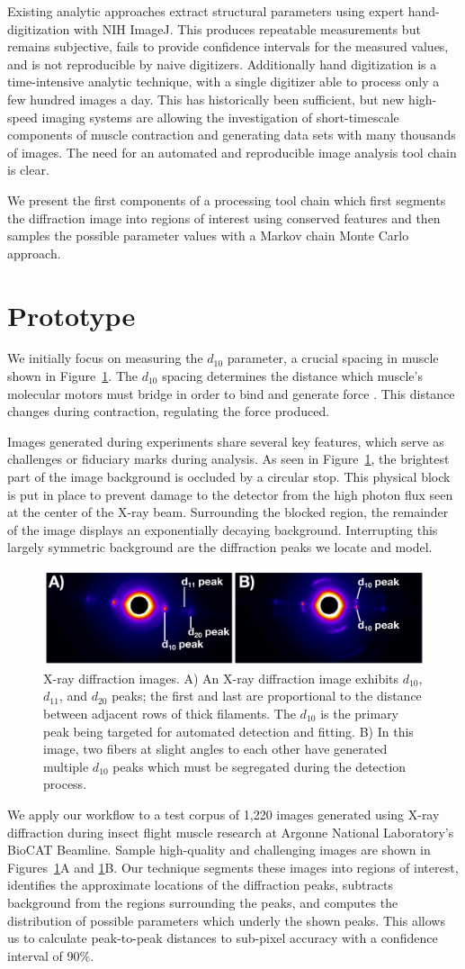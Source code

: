 \documentclass{sig-alternate}
\newcommand{\figureimgs}{
\begin{figure}[tbp]
  \centering
  \includegraphics[width=\linewidth]{figures/x_ray_image_montage}
  \vspace{-12pt}
  \caption{\label{fig:imgs}
  	X-ray diffraction images.
    A) An X-ray diffraction image exhibits $d_{10}$, $d_{11}$, and
    $d_{20}$ peaks; the first and last are proportional to the
    distance between adjacent rows of thick filaments. The $d_{10}$ is
    the primary peak being targeted for automated detection and
    fitting. B) In this image, two fibers at slight angles to each
    other have generated multiple $d_{10}$ peaks which must be
    segregated during the detection process.  
	}
	\vspace{-2pt}
\end{figure}
}
\begin{document}
Existing analytic approaches extract structural parameters using
expert hand-digitization with NIH ImageJ. This produces repeatable
measurements but remains subjective, fails to provide confidence
intervals for the measured values, and is not reproducible by naive
digitizers. Additionally hand digitization is a time-intensive
analytic technique, with a single digitizer able to process only a few
hundred images a day.  This has historically been sufficient, but new
high-speed imaging systems are allowing the investigation of
short-timescale components of muscle contraction and generating data
sets with many thousands of images. The need for an automated and
reproducible image analysis tool chain is clear. 

We present the first components of a processing tool chain which first
segments the diffraction image into regions of interest using
conserved features and then samples the possible parameter values with
a Markov chain Monte Carlo approach.  


\section{Prototype}
\label{sec:proto}


We initially focus on measuring the $d_{10}$ parameter, a crucial
spacing in muscle shown in Figure~\ref{fig:imgs}. The $d_{10}$ spacing
determines the distance which muscle's molecular motors must bridge in
order to bind and generate force \cite{Williams2013}. This distance
changes during contraction, regulating the force produced.

Images generated during experiments share several key features, which
serve as challenges or fiduciary marks during analysis. As seen in
Figure~\ref{fig:imgs}, the brightest part of the image background is
occluded by a circular stop. This physical block is put in place to
prevent damage to the detector from the high photon flux seen at the
center of the X-ray beam. Surrounding the blocked region, the
remainder of the image displays an exponentially decaying background.
Interrupting this largely symmetric background are the diffraction
peaks we locate and model. 

\figureimgs

We apply our workflow to a test corpus of 1,220 images generated using
X-ray diffraction during insect flight muscle research at Argonne
National Laboratory's BioCAT Beamline. Sample high-quality and
challenging images are shown in Figures~\ref{fig:imgs}A and
\ref{fig:imgs}B. Our technique segments these images into regions of
interest, identifies the approximate locations of the diffraction
peaks, subtracts background from the regions surrounding the peaks,
and computes the distribution of possible parameters which underly the
shown peaks. This allows us to calculate peak-to-peak distances to
sub-pixel accuracy with a confidence interval of 90\%.
\end{document}
